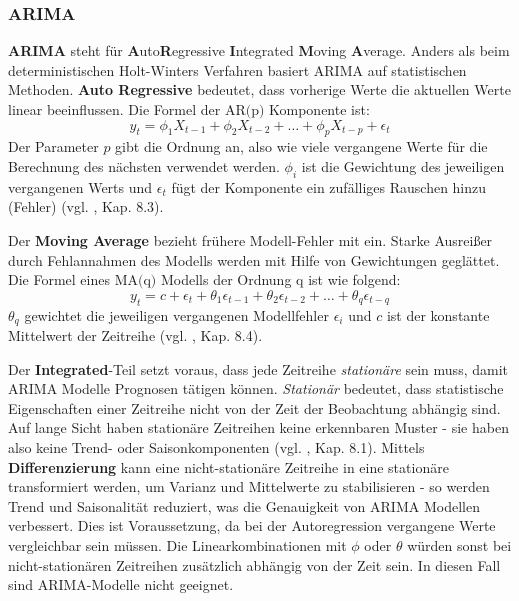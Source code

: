 \subsubsection{ARIMA}
\textbf{ARIMA} steht für \textbf{A}uto\textbf{R}egressive \textbf{I}ntegrated \textbf{M}oving \textbf{A}verage. Anders als beim deterministischen Holt-Winters Verfahren basiert ARIMA auf statistischen Methoden.
\textbf{Auto Regressive} bedeutet, dass vorherige Werte die aktuellen Werte linear beeinflussen. Die Formel der $\text{AR(p)}$ Komponente ist:
\begin{equation}
    y_t=\phi_1X_{t-1}+\phi_2X_{t-2}+\dots +\phi_pX_{t-p}+\epsilon_t
\end{equation}
Der Parameter $p$ gibt die Ordnung an, also wie viele vergangene Werte für die Berechnung des nächsten verwendet werden. $\phi_i$ ist die Gewichtung des jeweiligen vergangenen Werts und $\epsilon_t$ fügt der Komponente ein zufälliges Rauschen hinzu (Fehler) (vgl. \citeauthor{hyndman2018} \citeyear{hyndman2018}, Kap. 8.3).

Der \textbf{Moving Average} bezieht frühere Modell-Fehler mit ein. Starke Ausreißer durch Fehlannahmen des Modells werden mit Hilfe von Gewichtungen geglättet. Die Formel eines $\text{MA(q)}$ Modells der Ordnung $\text{q}$ ist wie folgend:
\begin{equation}
    y_t=c+\epsilon_t+\theta_1\epsilon_{t-1}+\theta_2\epsilon_{t-2}+\dots+\theta_q\epsilon_{t-q}
\end{equation}
$\theta_q$ gewichtet die jeweiligen vergangenen Modellfehler $\epsilon_i$ und $c$ ist der konstante Mittelwert der Zeitreihe (vgl. \citeauthor{hyndman2018} \citeyear{hyndman2018}, Kap. 8.4). 

Der \textbf{Integrated}-Teil setzt voraus, dass jede Zeitreihe \textit{stationäre} sein muss, damit ARIMA Modelle Prognosen tätigen können. \textit{Stationär} bedeutet, dass statistische Eigenschaften einer Zeitreihe nicht von der Zeit der Beobachtung abhängig sind. Auf lange Sicht haben stationäre Zeitreihen keine erkennbaren Muster - sie haben also keine Trend- oder Saisonkomponenten (vgl. \citeauthor{hyndman2018} \citeyear{hyndman2018}, Kap. 8.1). Mittels \textbf{Differenzierung} kann eine nicht-stationäre Zeitreihe in eine stationäre transformiert werden, um Varianz und Mittelwerte zu stabilisieren - so werden Trend und Saisonalität reduziert, was die Genauigkeit von ARIMA Modellen verbessert. Dies ist Voraussetzung, da bei der Autoregression vergangene Werte vergleichbar sein müssen. Die Linearkombinationen mit $\phi$ oder $\theta$ würden sonst bei nicht-stationären Zeitreihen zusätzlich abhängig von der Zeit sein. In diesen Fall sind ARIMA-Modelle nicht geeignet.

